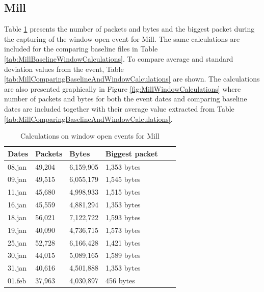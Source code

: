 \newpage
\subsection{Mill}
Table \ref{tab:MillWindowCalculations} presents the number of packets and bytes and the biggest packet during the capturing of the window open event for Mill. The same calculations are included for the comparing baseline files in Table \ref{tab:MillBaselineWindowCalculations}. To compare average and standard deviation values from the event, Table \ref{tab:MillComparingBaselineAndWindowCalculations} are shown. The calculations are also presented graphically in Figure \ref{fig:MillWindowCalculations} where number of packets and bytes for both the event dates and comparing baseline dates are included together with their average value extracted from Table \ref{tab:MillComparingBaselineAndWindowCalculations}.

\begin{table}[H]
    \centering
    \caption{Calculations on window open events for Mill}
    \begin{tabular}{|l|l|l|l|l|l|}
    \hline
        \textbf{Dates} & \textbf{Packets} & \textbf{Bytes} & \textbf{Biggest packet} \\ \hline
        08.jan & 49,204 & 6,159,905 & 1,353 bytes   \\ \hline
        09.jan & 49,515 & 6,055,179 & 1,545 bytes   \\ \hline
        11.jan & 45,680 & 4,998,933 & 1,515 bytes   \\ \hline
        16.jan & 45,559 & 4,881,294 & 1,353 bytes \\ \hline
        18.jan & 56,021 & 7,122,722 & 1,593 bytes   \\ \hline
        19.jan & 40,090 & 4,736,715 & 1,573 bytes \\ \hline
        25.jan & 52,728 & 6,166,428 & 1,421 bytes \\ \hline
        30.jan & 44,015 & 5,089,165 & 1,589 bytes  \\ \hline
        31.jan & 40,616 & 4,501,888 & 1,353 bytes \\ \hline
        01.feb & 37,963 & 4,030,897 & 456 bytes \\ \hline
    \end{tabular}
    \label{tab:MillWindowCalculations}
\end{table}

